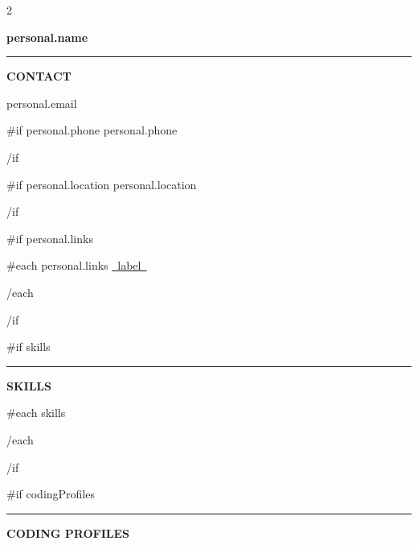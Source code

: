 \documentclass[10pt,a4paper]{article}
\newcommand{\sidebarseparator}{%
    \par\vspace{5pt}%
    {\color{sideMuted!45}\rule{\linewidth}{0.5pt}}%
    \par\vspace{5pt}%
}
\begin{document}
\color{bodytext}

\setlength{\columnsep}{0.045\textwidth}

\begin{paracol}{2}

\switchcolumn[0]
\color{white}

{\fontsize{21}{24}\selectfont
\bfseries {{personal.name}}
\par}

\vspace{5pt}
{\color{accent}\rule{\linewidth}{2pt}}
\vspace{5pt}

{\large\bfseries\color{accent}CONTACT\par}
\vspace{3pt}

{\small\color{sideMuted}
{{personal.email}}
\par

{{#if personal.phone}}
\vspace{3pt}
{{personal.phone}}
\par
{{/if}}

{{#if personal.location}}
\vspace{3pt}
{{personal.location}}
\par
{{/if}}
}

{{#if personal.links}}
\vspace{4pt}
{\small
{{#each personal.links}}
\href{ {{~url~}} }{ {{~label~}} }
\par
\vspace{2pt}
{{/each}}
}
{{/if}}

{{#if skills}}
\sidebarseparator
{\large\bfseries\color{accent}SKILLS\par}
\vspace{3pt}

{\small
{{#each skills}}
\textbf{ }
\par
{ }
\par
\vspace{4pt}
{{/each}}
}
{{/if}}

{{#if codingProfiles}}
\sidebarseparator
{\large\bfseries\color{accent}CODING PROFILES\par}
\vspace{4pt}


\end{paracol}
\end{document}
